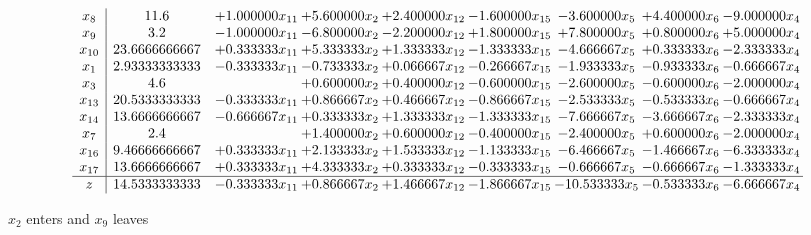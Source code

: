 \documentclass[10pt]{article}
\begin{document}
 \[\begin{array}{c| c c@{\hskip 2pt} c@{\hskip 2pt} c@{\hskip 2pt} c@{\hskip 2pt} c@{\hskip 2pt} c@{\hskip 2pt} c@{\hskip 2pt} }
 x_{8}   &  11.6 & + 1.000000 x_{11} & + 5.600000 x_{2} & + 2.400000 x_{12} & -1.600000 x_{15} & -3.600000 x_{5} & + 4.400000 x_{6} & -9.000000 x_{4}\\
 x_{9}   &  3.2 & -1.000000 x_{11} & -6.800000 x_{2} & -2.200000 x_{12} & + 1.800000 x_{15} & + 7.800000 x_{5} & + 0.800000 x_{6} & + 5.000000 x_{4}\\
 x_{10}   &  23.6666666667 & + 0.333333 x_{11} & + 5.333333 x_{2} & + 1.333333 x_{12} & -1.333333 x_{15} & -4.666667 x_{5} & + 0.333333 x_{6} & -2.333333 x_{4}\\
 x_{1}   &  2.93333333333 & -0.333333 x_{11} & -0.733333 x_{2} & + 0.066667 x_{12} & -0.266667 x_{15} & -1.933333 x_{5} & -0.933333 x_{6} & -0.666667 x_{4}\\
 x_{3}   &  4.6  &   & + 0.600000 x_{2} & + 0.400000 x_{12} & -0.600000 x_{15} & -2.600000 x_{5} & -0.600000 x_{6} & -2.000000 x_{4}\\
 x_{13}   &  20.5333333333 & -0.333333 x_{11} & + 0.866667 x_{2} & + 0.466667 x_{12} & -0.866667 x_{15} & -2.533333 x_{5} & -0.533333 x_{6} & -0.666667 x_{4}\\
 x_{14}   &  13.6666666667 & -0.666667 x_{11} & + 0.333333 x_{2} & + 1.333333 x_{12} & -1.333333 x_{15} & -7.666667 x_{5} & -3.666667 x_{6} & -2.333333 x_{4}\\
 x_{7}   &  2.4  &   & + 1.400000 x_{2} & + 0.600000 x_{12} & -0.400000 x_{15} & -2.400000 x_{5} & + 0.600000 x_{6} & -2.000000 x_{4}\\
 x_{16}   &  9.46666666667 & + 0.333333 x_{11} & + 2.133333 x_{2} & + 1.533333 x_{12} & -1.133333 x_{15} & -6.466667 x_{5} & -1.466667 x_{6} & -6.333333 x_{4}\\
 x_{17}   &  13.6666666667 & + 0.333333 x_{11} & + 4.333333 x_{2} & + 0.333333 x_{12} & -0.333333 x_{15} & -0.666667 x_{5} & -0.666667 x_{6} & -1.333333 x_{4}\\
\hline
z    &  14.5333333333 & -0.333333 x_{11} & + 0.866667 x_{2} & + 1.466667 x_{12} & -1.866667 x_{15} & -10.533333 x_{5} & -0.533333 x_{6} & -6.666667 x_{4}\\
\end{array}\]


 $ x_{2} $ enters and $ x_{9} $ leaves 
\end{document}
